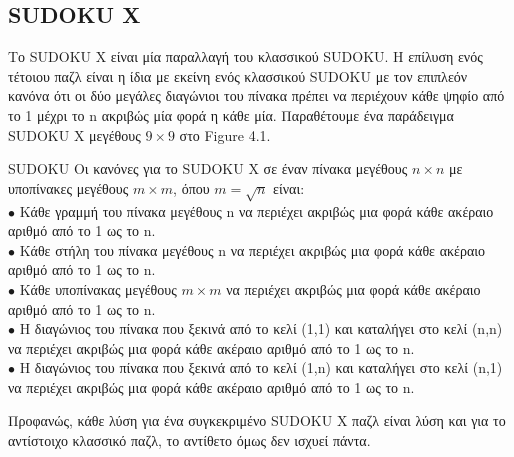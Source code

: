 \documentclass[12pt]{book}
\theoremstyle{definition}
\begin{document}
\subsection{SUDOKU X}

Το SUDOKU X είναι μία παραλλαγή του κλασσικού SUDOKU. Η επίλυση ενός τέτοιου παζλ είναι η ίδια με εκείνη ενός κλασσικού SUDOKU με τον επιπλεόν κανόνα ότι οι δύο μεγάλες διαγώνιοι του πίνακα πρέπει να περιέχουν κάθε ψηφίο από το 1 μέχρι το n ακριβώς μία φορά η κάθε μία. Παραθέτουμε ένα παράδειγμα SUDOKU X μεγέθους \(9 \times 9 \) στο Figure 4.1.\par

\begin{mytheorem}{SUDOKU}{}
	Οι κανόνες για το SUDOKU X σε έναν πίνακα μεγέθους \(n \times n\) με υποπίνακες μεγέθους \(m \times m\), 	όπου \(m = \sqrt{n}\) είναι: \\
	\(\bullet\) Κάθε γραμμή του πίνακα μεγέθους n να περιέχει ακριβώς μια φορά κάθε ακέραιο αριθμό από το 1 ως το n. \\
	\(\bullet\) Κάθε στήλη του πίνακα μεγέθους n να περιέχει ακριβώς μια φορά κάθε ακέραιο αριθμό από το 1 ως το n. \\
	\(\bullet\) Κάθε υποπίνακας μεγέθους \(m \times m\) να περιέχει ακριβώς μια φορά κάθε ακέραιο αριθμό από το 1 ως το n. \\
	\(\bullet\) Η διαγώνιος του πίνακα που ξεκινά από το κελί (1,1) και καταλήγει στο κελί (n,n) να περιέχει ακριβώς μια φορά κάθε ακέραιο αριθμό από το 1 ως το n. \\
	\(\bullet\) Η διαγώνιος του πίνακα που ξεκινά από το κελί (1,n) και καταλήγει στο κελί (n,1) να περιέχει ακριβώς μια φορά κάθε ακέραιο αριθμό από το 1 ως το n. \\

\end{mytheorem}

Προφανώς, κάθε λύση για ένα συγκεκριμένο SUDOKU X παζλ είναι λύση και για το αντίστοιχο κλασσικό παζλ, το αντίθετο όμως δεν ισχυεί πάντα. \par
\end{document}
